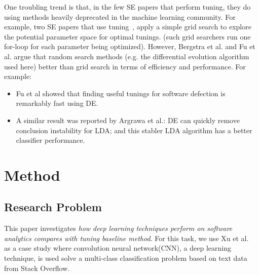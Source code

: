 \documentclass[sigconf,review, anonymous]{acmart}
\theoremstyle{break}
\newcommand{\bi}{\begin{itemize}[leftmargin=0.4cm]}
\newcommand{\ei}{\end{itemize}}
\begin{document}
One troubling trend is that, in the few SE papers that perform tuning,
they do using methods heavily deprecated in the machine learning community.
For example, two SE papers that use tuning~\cite{lessmann2008benchmarking,tantithamthavorn2016automated}, 
apply a simple grid search to explore the potential parameter space for optimal tunings.
(such grid searchers run one for-loop for each parameter being optimized). 
However, Bergstra et al.\cite{bergstra2012random} and 
Fu et al.\cite{fu2016differential} argue that random search methods
(e.g. the 
differential evolution algorithm used here) better than 
grid search in terms of efficiency and performance.
For example:
\bi
\item
Fu et al showed that finding useful tunings for software defection is remarkably fast  using DE.
\item
A similar result was reported by Argrawa et al.: DE can quickly remove
conclusion instability for LDA; and this stabler LDA algorithm has a better
classifier performance.
\ei




\section{Method}

\subsection{Research Problem}\label{problem}
This paper investigates {\it how deep learning techniques perform on software analytics compares
with tuning baseline method}.
For this task, we use  Xu et al.~\cite{xu2016predicting}  as a case study
where convolution neural network(CNN), a deep learning technique, is used
solve a multi-class classification problem based on text data from Stack Overflow.
\end{document}
